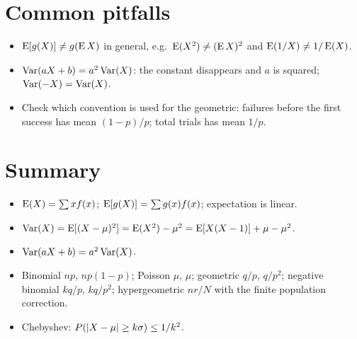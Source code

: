 \section{Common pitfalls}

\begin{itemize}
  \item $\operatorname{E}[g(X)] \ne g(\operatorname{E} X)$ in general, e.g.\ $\operatorname{E}(X^2) \ne (\operatorname{E} X)^2$ and
        $\operatorname{E}(1/X) \ne 1/\operatorname{E}(X)$.
  \item $\operatorname{Var}(aX + b) = a^2\operatorname{Var}(X)$: the constant disappears and $a$ is squared;
        $\operatorname{Var}(-X) = \operatorname{Var}(X)$.
  \item Check which convention is used for the geometric: failures before the first
        success has mean $(1-p)/p$; total trials has mean $1/p$.
\end{itemize}

\section{Summary}

\begin{itemize}
  \item $\operatorname{E}(X) = \sum x f(x)$; $\operatorname{E}[g(X)] = \sum g(x) f(x)$; expectation is linear.
  \item $\operatorname{Var}(X) = \operatorname{E}[(X-\mu)^2] = \operatorname{E}(X^2) - \mu^2 = \operatorname{E}[X(X-1)] + \mu - \mu^2$.
  \item $\operatorname{Var}(aX+b) = a^2\operatorname{Var}(X)$.
  \item Binomial $np$, $np(1-p)$; Poisson $\mu$, $\mu$; geometric $q/p$, $q/p^2$;
        negative binomial $kq/p$, $kq/p^2$; hypergeometric $nr/N$ with the finite
        population correction.
  \item Chebyshev: $P(\left\lvert X-\mu \right\rvert\ge k\sigma)\le 1/k^2$.
\end{itemize}
